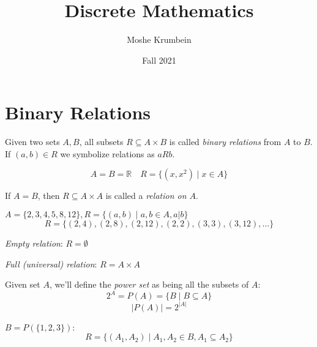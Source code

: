 \documentclass[00_complete]{subfiles}
\title{Discrete Mathematics}
\author{Moshe Krumbein}
\date{Fall 2021}
\begin{document}

\section{Binary Relations}
\begin{definition}
Given two sets $A, B$, all subsets $R \subseteq A \times B$ is called
\emph{binary relations} from $A$ to $B$. If $(a,b) \in R$ we symbolize
relations as $aRb$.
\end{definition}

\begin{example}
$$A=B=\mathbb{R} \quad R=\{(x,x^2) \mid x \in A \}$$
\end{example}

\begin{definition}
If $A=B$, then $R \subseteq A \times A$ is called a \emph{relation on $A$}.
\end{definition}

\begin{example}
$A=\{2,3,4,5,8,12\}, R=\{(a,b) \mid a, b \in A, a | b \}$
$$R=\{(2,4), (2,8),(2,12),(2,2),(3,3),(3,12),\ldots \}$$
\end{example}

\begin{definition}
\emph{Empty relation}: $R=\emptyset$
\end{definition}
\begin{definition}
\emph{Full (universal) relation}: $R = A \times A$
\end{definition}
\begin{definition}
Given set $A$, we'll define the \emph{power set} as being all the subsets of $A$:
$$2^A = P(A) = \{B \mid B \subseteq A \}$$
$$|P(A)| = 2^{|A|}$$
\end{definition}
\begin{example}
$B = P(\{1,2,3\})$:
$$R=\{(A_1,A_2) \mid A_1, A_2 \in B, A_1 \subseteq A_2 \}$$
\end{example}
\end{document}
